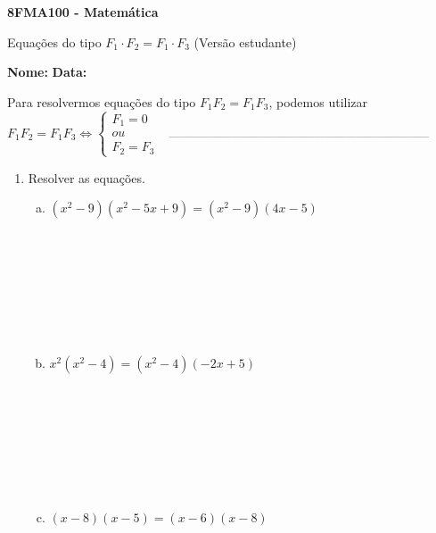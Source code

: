 \documentclass[a4paper,14pt]{article}
\begin{document}
	
	\noindent\textbf{8FMA100 - Matemática} 
	
	\begin{center}Equações do tipo $F_1 \cdot F_2 = F_1 \cdot F_3$ (Versão estudante)
	\end{center}
	
	\noindent\textbf{Nome:} \underline{\hspace{10cm}}
	\noindent\textbf{Data:} \underline{\hspace{4cm}}
	
    \begin{multicols}{2}
    	\noindent Para resolvermos equações do tipo $F_1 F_2 = F_1 F_3$, podemos utilizar $F_1 F_2 = F_1 F_3 \Leftrightarrow \begin{cases} F_1 = 0 \\ ou \\ F_2 = F_3 \end{cases}$
    	\noindent\textsubscript{~---------------------------------------------------------------------------}
    	\begin{enumerate}
    		\item Resolver as equações.
    		\begin{enumerate}[a)]
    			\item $(x^2 - 9)(x^2 - 5x + 9) = (x^2 - 9)(4x - 5)$ \\\\\\\\\\\\\\\\
    			\item $x^2(x^2 - 4) = (x^2 - 4)(-2x + 5)$ \\\\\\\\\\\\\\\\
    			\item $(x - 8)(x - 5) = (x - 6)(x - 8)$ \\\\\\\\\\\\

\end{enumerate}
\end{enumerate}
\end{multicols}
\end{document}
